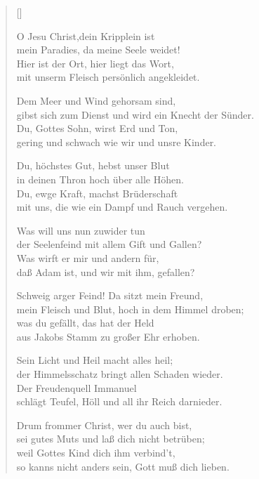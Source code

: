 \begin{multicols}{2}
\settowidth{\versewidth}{gibst sich zum Dienst und wird ein Knecht der Sünder.}
\begin{verse}[\versewidth]

 O Jesu Christ,dein Kripplein ist\\
mein Paradies, da meine Seele weidet!\\
Hier ist der Ort, hier liegt das Wort,\\
mit unserm Fleisch persönlich angekleidet.

 Dem Meer und Wind gehorsam sind,\\
gibst sich zum Dienst und wird ein Knecht der Sünder.\\
Du, Gottes Sohn, wirst Erd und Ton,\\
gering und schwach wie wir und unsre Kinder.

 Du, höchstes Gut, hebst unser Blut\\
in deinen Thron hoch über alle Höhen.\\
Du, ewge Kraft, machst Brüderschaft\\
mit uns, die wie ein Dampf und Rauch vergehen.

 Was will uns nun zuwider tun\\
der Seelenfeind mit allem Gift und Gallen?\\
Was wirft er mir und andern für,\\
daß Adam ist, und wir mit ihm, gefallen?

 Schweig arger Feind! Da sitzt mein Freund,\\
mein Fleisch und Blut, hoch in dem Himmel droben;\\
was du gefällt, das hat der Held\\
aus Jakobs Stamm zu großer Ehr erhoben.

 Sein Licht und Heil macht alles heil;\\
der Himmelsschatz bringt allen Schaden wieder.\\
Der Freudenquell Immanuel\\
schlägt Teufel, Höll und all ihr Reich darnieder.

 Drum frommer Christ, wer du auch bist,\\
sei gutes Muts und laß dich nicht betrüben;\\
weil Gottes Kind dich ihm verbind't,\\
so kanns nicht anders sein, Gott muß dich lieben.


\end{verse}
\end{multicols}
